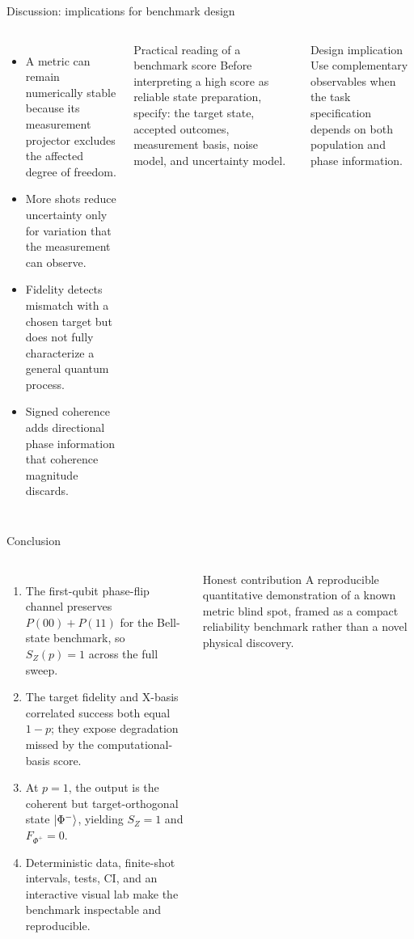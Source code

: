 \documentclass[10pt,aspectratio=169]{beamer}
\newcommand{\sourcefoot}[1]{}
\begin{document}
\begin{frame}[t]{Discussion: implications for benchmark design}
\begin{columns}[T]
\begin{itemize}
  \item A metric can remain numerically stable because its measurement projector excludes the affected degree of freedom.
  \item More shots reduce uncertainty only for variation that the measurement can observe.
  \item Fidelity detects mismatch with a chosen target but does not fully characterize a general quantum process.
  \item Signed coherence adds directional phase information that coherence magnitude discards.
\end{itemize}
\begin{block}{Practical reading of a benchmark score}
Before interpreting a high score as reliable state preparation, specify: the target state, accepted outcomes, measurement basis, noise model, and uncertainty model.
\end{block}
\begin{block}{Design implication}
Use complementary observables when the task specification depends on both population and phase information.
\end{block}
\end{columns}
\sourcefoot{Interpretation grounded in the exact and finite-shot results shown in this deck.}
\end{frame}

\begin{frame}[t]{Conclusion}
\begin{columns}[T]
\begin{enumerate}
  \item The first-qubit phase-flip channel preserves $P(00)+P(11)$ for the Bell-state benchmark, so $S_Z(p)=1$ across the full sweep.
  \item The target fidelity and X-basis correlated success both equal $1-p$; they expose degradation missed by the computational-basis score.
  \item At $p=1$, the output is the coherent but target-orthogonal state $\ket{\Phi^-}$, yielding $S_Z=1$ and $F_{\Phi^+}=0$.
  \item Deterministic data, finite-shot intervals, tests, CI, and an interactive visual lab make the benchmark inspectable and reproducible.
\end{enumerate}
\begin{block}{Honest contribution}
A reproducible quantitative demonstration of a known metric blind spot, framed as a compact reliability benchmark rather than a novel physical discovery.
\end{block}
\end{columns}
\sourcefoot{All conclusions are limited to the declared classical simulation model.}
\end{frame}
\end{document}
